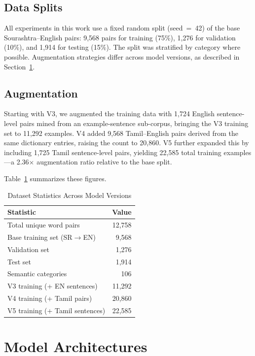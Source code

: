 \documentclass[conference]{IEEEtran}
\begin{document}
\subsection{Data Splits}

All experiments in this work use a fixed random split (seed~=~42) of the base Sourashtra--English pairs: 9,568 pairs for training (75\%), 1,276 for validation (10\%), and 1,914 for testing (15\%). The split was stratified by category where possible. Augmentation strategies differ across model versions, as described in Section~\ref{sec:models}.

\subsection{Augmentation}

Starting with V3, we augmented the training data with 1,724 English sentence-level pairs mined from an example-sentence sub-corpus, bringing the V3 training set to 11,292 examples. V4 added 9,568 Tamil--English pairs derived from the same dictionary entries, raising the count to 20,860. V5 further expanded this by including 1,725 Tamil sentence-level pairs, yielding 22,585 total training examples---a 2.36$\times$ augmentation ratio relative to the base split.

Table~\ref{tab:dataset} summarizes these figures.

\begin{table}[htbp]
\centering
\caption{Dataset Statistics Across Model Versions}
\label{tab:dataset}
\begin{tabular}{lr}
\toprule
\textbf{Statistic} & \textbf{Value} \\
\midrule
Total unique word pairs & 12,758 \\
Base training set (SR$\rightarrow$EN) & 9,568 \\
Validation set & 1,276 \\
Test set & 1,914 \\
Semantic categories & 106 \\
\midrule
V3 training (+ EN sentences) & 11,292 \\
V4 training (+ Tamil pairs) & 20,860 \\
V5 training (+ Tamil sentences) & 22,585 \\
\bottomrule
\end{tabular}
\end{table}

\section{Model Architectures}\label{sec:models}
\end{document}

